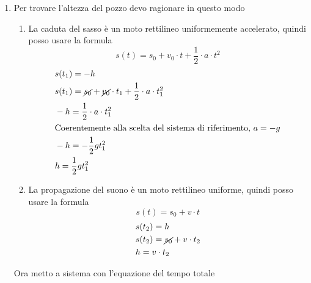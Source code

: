 \documentclass{article}
\begin{document}
\begin{enumerate}
    \item Per trovare l'altezza del pozzo devo ragionare in questo modo
          \begin{enumerate}
              \item[(a.1)] La caduta del sasso è un moto rettilineo uniformemente accelerato, quindi posso usare la formula
                    \begin{equation*}
                        \boxed{s(t) = s_0 + v_0 \cdot t + \frac{1}{2} \cdot a \cdot t^2}
                    \end{equation*}
                    \begin{align*}
                         & s(t_1) = - h                                                                     \\
                         & s(t_1) = \cancel{s_0} + \cancel{v_0} \cdot t_1 + \frac{1}{2} \cdot a \cdot t_1^2 \\
                         & -h = \frac{1}{2} \cdot a \cdot t_1^2                                             \\
                         & \text{Coerentemente alla scelta del sistema di riferimento, } a = -g             \\
                         & -h = -\frac{1}{2} g t_1^2                                                        \\
                         & h = \frac{1}{2} g t_1^2
                    \end{align*}
              \item[(a.2)] La propagazione del suono è un moto rettilineo uniforme, quindi posso usare la formula
                    \begin{equation*}
                        \boxed{s(t) = s_0 + v \cdot t}
                    \end{equation*}
                    \begin{align*}
                         & s(t_2) = h                          \\
                         & s(t_2) = \cancel{s_0} + v \cdot t_2 \\
                         & h = v \cdot t_2                     \\
                    \end{align*}
          \end{enumerate}
          Ora metto a sistema con l'equazione del tempo totale
          \begin{align*}

\end{align*}
\end{enumerate}
\end{document}
